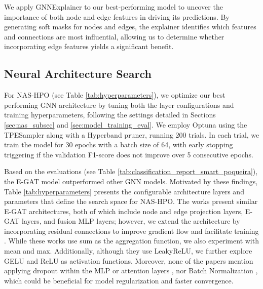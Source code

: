 \documentclass[journal]{IEEEtran}
\begin{document}
We apply GNNExplainer to our best-performing model to uncover the importance of both node and edge features in driving its predictions. By generating soft masks for nodes and edges, the explainer identifies which features and connections are most influential, allowing us to determine whether incorporating edge features yields a significant benefit. 



\subsection{Neural Architecture Search} \label{sec:nas_section}


For NAS-HPO (see Table \ref{tab:hyperparameters}), we optimize our best performing GNN architecture by tuning both the layer configurations and training hyperparameters, following the settings detailed in Sections \ref{sec:nas_subsec} and \ref{sec:model_training_eval}. We employ Optuna \cite{akiba2019optuna} using the TPESampler along with a Hyperband pruner, running 200 trials. In each trial, we train the model for 30 epochs with a batch size of 64, with early stopping triggering if the validation F1-score does not improve over 5 consecutive epochs. 

Based on the evaluations (see Table \ref{tab:classification_report_smart_poqueira}), the E-GAT model outperformed other GNN models. Motivated by these findings, Table \ref{tab:hyperparameters} presents the configurable architecture layers and parameters that define the search space for NAS-HPO. The works \cite{wang2021egat, chen2021edge} present similar E-GAT architectures, both of which include node and edge projection layers, E-GAT layers, and fusion MLP layers; however, we extend the architecture by incorporating residual connections to improve gradient flow and facilitate training \cite{he2016deep}. While these works use sum as the aggregation function, we also experiment with mean and max. Additionally, although they use LeakyReLU, we further explore GELU and ReLU as activation functions. Moreover, none of the papers mention applying dropout within the MLP or attention layers \cite{srivastava2014dropout}, nor Batch Normalization \cite{ioffe2015batch}, which could be beneficial for model regularization and faster convergence.
\end{document}
